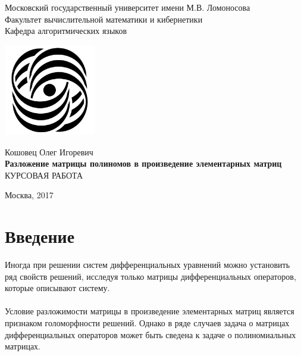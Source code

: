 \documentclass[12pt]{extreport}
\begin{document}
	\begin{titlepage}
		\begin{center}  
			\large{Московский государственный университет имени М.В. Ломоносова\\
			Факультет вычислительной математики и кибернетики\\
			Кафедра алгоритмических языков}\\
		\end{center}
		\begin{center}
			\includegraphics[width=4cm]{vmk.png}
		\end{center}
		\begin{center}
			\vspace{30pt}
			\Large{Кошовец Олег Игоревич}
			\\
			\vspace{20pt}
			\LARGE{\textbf{Разложение матрицы полиномов в произведение элементарных матриц}}
			\\
			\vspace{30pt}
			\Large{КУРСОВАЯ РАБОТА}\\
			\vspace{70pt}
		\end{center}
		\vspace{120pt}
		\hfill
		\begin{minipage}{1.0\textwidth}
		\end{minipage}
		\vspace{70pt}
		\begin{center}
			\large{Москва, 2017}
		\end{center}
	\end{titlepage}
	\newpage
	\tableofcontents
	\newpage
	\chapter{Введение}
		Иногда при решении систем дифференциальных уравнений можно установить ряд 
		свойств решений, исследуя только матрицы дифференциальных операторов,
		которые описывают систему.
		\\\\
		Условие разложимости матрицы в произведение элементарных матриц является
		признаком голоморфности решений.
		Однако в ряде случаев задача о матрицах дифференциальных операторов
		может быть сведена к задаче о полиномиальных матрицах.
\end{document}
